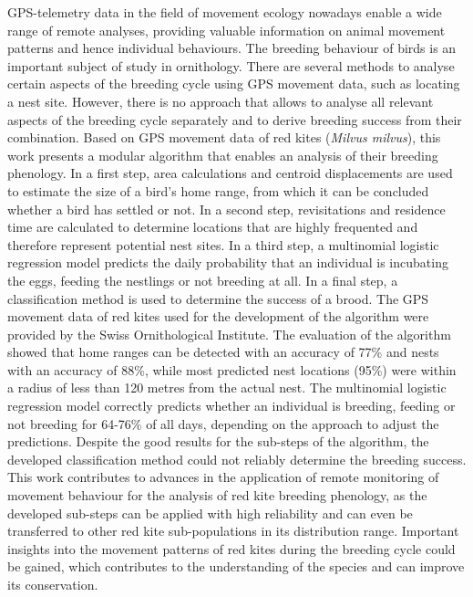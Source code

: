 GPS-telemetry data in the field of movement ecology nowadays enable a wide range of remote analyses, providing valuable information on animal movement patterns and hence individual behaviours. The breeding behaviour of birds is an important subject of study in ornithology. There are several methods to analyse certain aspects of the breeding cycle using GPS movement data, such as locating a nest site. However, there is no approach that allows to analyse all relevant aspects of the breeding cycle separately and to derive breeding success from their combination. Based on GPS movement data of red kites (\textit{Milvus milvus}), this work presents a modular algorithm that enables an analysis of their breeding phenology. In a first step, area calculations and centroid displacements are used to estimate the size of a bird's home range, from which it can be concluded whether a bird has settled or not. In a second step, revisitations and residence time are calculated to determine locations that are highly frequented and therefore represent potential nest sites. In a third step, a multinomial logistic regression model predicts the daily probability that an individual is incubating the eggs, feeding the nestlings or not breeding at all. In a final step, a classification method is used to determine the success of a brood. The GPS movement data of red kites used for the development of the algorithm were provided by the Swiss Ornithological Institute. The evaluation of the algorithm showed that home ranges can be detected with an accuracy of 77\% and nests with an accuracy of 88\%, while most predicted nest locations (95\%) were within a radius of less than 120 metres from the actual nest. The multinomial logistic regression model correctly predicts whether an individual is breeding, feeding or not breeding for 64-76\% of all days, depending on the approach to adjust the predictions. Despite the good results for the sub-steps of the algorithm, the developed classification method could not reliably determine the breeding success. This work contributes to advances in the application of remote monitoring of movement behaviour for the analysis of red kite breeding phenology, as the developed sub-steps can be applied with high reliability and can even be transferred to other red kite sub-populations in its distribution range. Important insights into the movement patterns of red kites during the breeding cycle could be gained, which contributes to the understanding of the species and can improve its conservation.